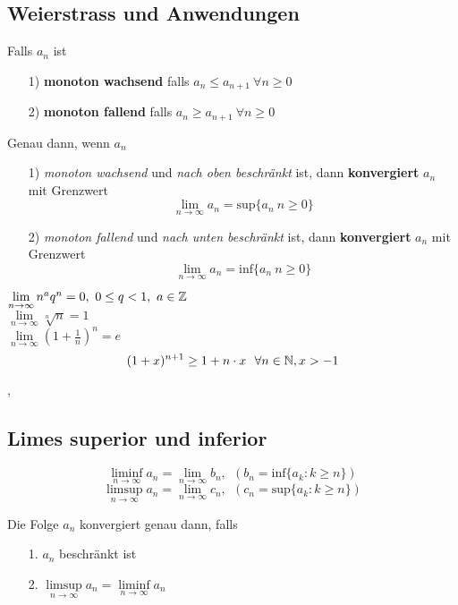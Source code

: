 \subsection{Weierstrass und Anwendungen}

\Def[2.2.1] Falls  $a_{n}$ ist
\begin{enumerate}
\item[1)] \textbf{monoton wachsend}  falls ${a_{n} \leq a_{n + 1} \ \forall n \geq 0}$
\item[2)] \textbf{monoton fallend} falls ${a_{n} \geq a_{n + 1} \ \forall n \geq 0}$ \\
\end{enumerate}


\Satz[2.2.2 (Weierstrass)] Genau dann, wenn $a_{n}$ 
\begin{enumerate}
\item[1)] \textit{monoton wachsend} und \textit{nach oben beschränkt} ist, dann \textbf{konvergiert} $a_{n}$ mit Grenzwert
\[ 
\lim\limits_{n \rightarrow \infty} a_{n} = \text{sup}\{a_{n} \: n \geq 0\}
\]
\item[2)] \textit{monoton fallend} und \textit{nach unten beschränkt} ist, dann \textbf{konvergiert} $a_{n}$ mit Grenzwert
\[ 
\lim\limits_{n \rightarrow \infty} a_{n} = \text{inf}\{a_{n} \: n \geq 0\}
\]
\end{enumerate}
\Bsp[2.2.3] $\lim\limits_{n \rightarrow \infty} n^{a}q^{n} = 0, \ 0 \leq q < 1, \ a \in \mathbb{Z}$ \\
\Bsp[2.2.5] $\lim\limits_{n \rightarrow \infty} \sqrt[n]{n} = 1$ \\
\Bsp[2.2.6] $\lim\limits_{n \rightarrow \infty} (1 + \frac{1}{n})^n = e$ \\
\[
(1 + x)^{n+1} \geq 1 + n \cdot x \ \ \forall n \in \N, x > -1
\] 

\sep

\subsection{Limes superior und inferior}

\Def[2.3.0]
\[
\liminf\limits_{n \rightarrow \infty} a_{n} = \lim\limits_{n \rightarrow \infty} b_{n}, \ \ (b_{n} = \text{inf} \{a_{k} : k \geq n \})
\]
\[
\limsup\limits_{n \rightarrow \infty} a_{n} = \lim\limits_{n \rightarrow \infty} c_{n}, \ \ (c_{n} = \text{sup} \{a_{k} : k \geq n \})
\]


\Lemma[2.4.1] Die Folge $a_{n}$ konvergiert genau dann, falls
\begin{enumerate}
\item[1.] $a_{n}$ beschränkt ist
\item[2.] $\limsup\limits_{n \rightarrow \infty} a_{n} = \liminf\limits_{n \rightarrow \infty} a_{n}$
\end{enumerate}

